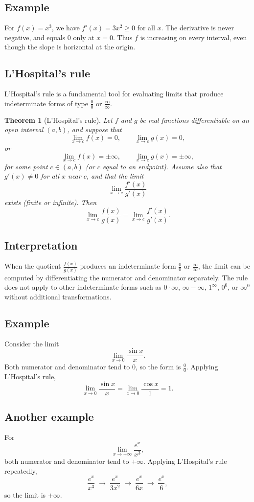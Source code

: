 \documentclass[11pt,a4paper]{article}
\theoremstyle{definition} \newtheorem{definition}{Definition} \theoremstyle{plain} \newtheorem{theorem}{Theorem}
\begin{document}
\subsection*{Example}
For $f(x)=x^3$, we have $f'(x)=3x^2 \ge 0$ for all $x$.
The derivative is never negative, and equals $0$ only at $x=0$.
Thus $f$ is increasing on every interval, even though the slope is horizontal at the origin.
\subsection{L'Hospital's rule}
L'Hospital's rule is a fundamental tool for evaluating limits that produce indeterminate forms of type $\frac{0}{0}$ or $\frac{\infty}{\infty}$.
\begin{theorem}[L'Hospital's rule]\label{thm:lhospital} Let $f$ and $g$ be real functions differentiable on an open interval $(a,b)$, and suppose that
\[ \lim_{x\to c} f(x) = 0, \qquad \lim_{x\to c} g(x) = 0, \]
or
\[ \lim_{x\to c} f(x) = \pm\infty, \qquad \lim_{x\to c} g(x) = \pm\infty, \]
for some point $c\in(a,b)$ (or $c$ equal to an endpoint).
Assume also that $g'(x)\neq 0$ for all $x$ near $c$, and that the limit
\[ \lim_{x\to c} \frac{f'(x)}{g'(x)} \]
exists (finite or infinite).
Then
\[ \lim_{x\to c} \frac{f(x)}{g(x)} = \lim_{x\to c} \frac{f'(x)}{g'(x)}. \]
\end{theorem}
\subsection*{Interpretation}
When the quotient $\frac{f(x)}{g(x)}$ produces an indeterminate form $\frac{0}{0}$ or $\frac{\infty}{\infty}$, the limit can be computed by differentiating the numerator and denominator separately.
The rule does not apply to other indeterminate forms such as $0\cdot\infty$, $\infty-\infty$, $1^\infty$, $0^0$, or $\infty^0$ without additional transformations.
\subsection*{Example}
Consider the limit
\[ \lim_{x\to 0} \frac{\sin x}{x}. \]
Both numerator and denominator tend to $0$, so the form is $\frac{0}{0}$.
Applying L'Hospital's rule,
\[ \lim_{x\to 0} \frac{\sin x}{x} = \lim_{x\to 0} \frac{\cos x}{1} = 1. \]
\subsection*{Another example}
For
\[ \lim_{x\to +\infty} \frac{e^x}{x^3}, \]
both numerator and denominator tend to $+\infty$.
Applying L'Hospital's rule repeatedly,
\[ \frac{e^x}{x^3} \;\longrightarrow\; \frac{e^x}{3x^2} \;\longrightarrow\; \frac{e^x}{6x} \;\longrightarrow\; \frac{e^x}{6}, \]
so the limit is $+\infty$.
\end{document}
